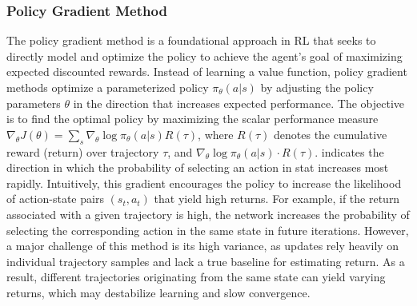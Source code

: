 \documentclass[preprint,12pt]{elsarticle}
\begin{document}
\subsubsection{Policy Gradient Method}
The policy gradient method is a foundational approach in RL that seeks to directly model and optimize the policy to achieve the agent's goal of maximizing expected discounted rewards. Instead of learning a value function, policy gradient methods optimize a parameterized policy $\pi_\theta(a|s)$ by adjusting the policy parameters $\theta$ in the direction that increases expected performance. The objective is to find the optimal policy by maximizing the scalar performance measure $\nabla _{\theta}J(\theta)= \sum_{s}^{}\nabla_\theta\log\pi_\theta(a|s)R(\tau)$, where $R(\tau)$ denotes the cumulative reward (return) over trajectory $\tau$, and $\nabla_\theta\log\pi_\theta(a|s)\cdot R(\tau)$. indicates the direction in which the probability of selecting an action in stat increases most rapidly. Intuitively, this gradient encourages the policy to increase the likelihood of action-state pairs $(s_t,a_t)$ that yield high returns. For example, if the return associated with a given trajectory is high, the network increases the probability of selecting the corresponding action in the same state in future iterations. However, a major challenge of this method is its high variance, as updates rely heavily on individual trajectory samples and lack a true baseline for estimating return. As a result, different trajectories originating from the same state can yield varying returns, which may destabilize learning and slow convergence. 
\end{document}
